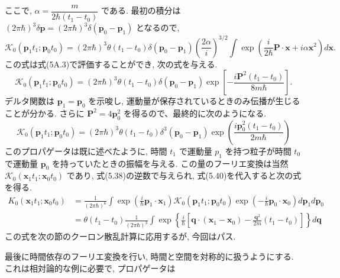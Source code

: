 \documentclass[a4paper,12pt]{article}
\begin{document}
ここで, $\alpha = \dfrac{m}{2\hbar(t_1 - t_0)}$ である. 最初の積分は $(2\pi\hbar)^3 \delta\mathbf{p} = (2\pi\hbar)^3 \delta(\mathbf{p}_0 - \mathbf{p}_1)$ となるので,
\begin{equation*}
    \mathcal{K}_0(\mathbf{p}_1  t_1; \mathbf{p}_0 t_0) = (2\pi \hbar)^3 \theta(t_1 - t_0) \delta(\mathbf{p}_0 - \mathbf{p}_1) \left( \frac{2\alpha}{i} \right)^{3/2} \int \exp \left( \frac{i}{2\hbar} \mathbf{P} \cdot \mathbf{x} + i\alpha\mathbf{x}^2 \right) d\mathbf{x}.
\end{equation*}
この式は式(5A.3)で評価することができ, 次の式を与える.
\begin{equation*}
    \mathcal{K}_0(\mathbf{p}_1  t_1; \mathbf{p}_0 t_0) = (2\pi \hbar)^3 \theta(t_1 - t_0) \delta(\mathbf{p}_0 - \mathbf{p}_1) \exp \left[ -\frac{i\mathbf{P}^2 (t_1 - t_0)}{8m\hbar} \right].
\end{equation*}
デルタ関数は $\mathbf{p}_1 = \mathbf{p}_0$ を示唆し, 運動量が保存されているときのみ伝播が生じることが分かる. さらに $\mathbf{P}^2 = 4\mathbf{p}_{0}^2$ を得るので、最終的に次のようになる.
\begin{equation*}
    \mathcal{K}_0(\mathbf{p}_1  t_1; \mathbf{p}_0 t_0) = (2\pi \hbar)^3 \theta(t_1 - t_0) \delta^3(\mathbf{p}_0 - \mathbf{p}_1) \exp \left( \frac{i\mathbf{p}_{0}^2 (t_1 - t_0)}{2m\hbar} \right) \tag{5.40}
\end{equation*}
このプロパゲータは既に述べたように, 時間 $t_1$ で運動量 $p_1$ を持つ粒子が時間 $t_0$ で運動量 $\mathbf{p}_0$ を持っていたときの振幅を与える. この量のフーリエ変換は当然 $\mathcal{K}_0(\mathbf{x}_1 t_1; \mathbf{x}_0 t_0)$ であり, 式(5.38)の逆数で与えられ, 式(5.40)を代入すると次の式を得る.
\begin{align*}
    K_0(\mathbf{x}_1 t_1; \mathbf{x}_0 t_0) &= \frac{1}{(2\pi \hbar)^6} \int \exp \left( \frac{i}{\hbar} \mathbf{p}_1 \cdot \mathbf{x}_1 \right) \mathcal{K}_0(\mathbf{p}_1  t_1; \mathbf{p}_0 t_0) \exp \left( -\frac{i}{\hbar} \mathbf{p}_0 \cdot \mathbf{x}_0 \right) d\mathbf{p}_1 d\mathbf{p}_0\\
    &= \theta(t_1 -t_0)\frac{1}{(2\pi\hbar)^3}\int\exp\left\{ \frac{i}{\hbar}\left[ \mathbf{q} \cdot (\mathbf{x}_1 - \mathbf{x}_0) - \frac{\mathbf{q}^2}{2m}(t_1 - t_0) \right] \right\}d\mathbf{q} \tag{5.41}
\end{align*}
この式を次の節のクーロン散乱計算に応用するが, 今回はパス.\par
最後に時間依存のフーリエ変換を行い, 時間と空間を対称的に扱うようにする. \\
これは相対論的な例に必要で, プロパゲータは
\end{document}
